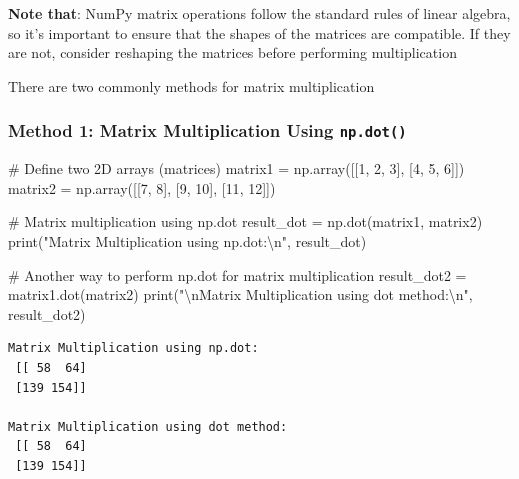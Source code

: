 \documentclass[
  letterpaper,
  DIV=11,
  numbers=noendperiod]{scrreprt}
\newenvironment{Shaded}{\begin{snugshade}}{\end{snugshade}}
\newcommand{\BuiltInTok}[1]{\textcolor[rgb]{0.00,0.23,0.31}{#1}}
\newcommand{\CharTok}[1]{\textcolor[rgb]{0.13,0.47,0.30}{#1}}
\newcommand{\CommentTok}[1]{\textcolor[rgb]{0.37,0.37,0.37}{#1}}
\newcommand{\DecValTok}[1]{\textcolor[rgb]{0.68,0.00,0.00}{#1}}
\newcommand{\NormalTok}[1]{\textcolor[rgb]{0.00,0.23,0.31}{#1}}
\newcommand{\OperatorTok}[1]{\textcolor[rgb]{0.37,0.37,0.37}{#1}}
\newcommand{\StringTok}[1]{\textcolor[rgb]{0.13,0.47,0.30}{#1}}
\begin{document}
\textbf{Note that}: NumPy matrix operations follow the standard rules of
linear algebra, so it's important to ensure that the shapes of the
matrices are compatible. If they are not, consider reshaping the
matrices before performing multiplication

There are two commonly methods for matrix multiplication

\hypertarget{method-1-matrix-multiplication-using-np.dot}{%
\subsubsection{\texorpdfstring{Method 1: Matrix Multiplication Using
\texttt{np.dot()}}{Method 1: Matrix Multiplication Using np.dot()}}\label{method-1-matrix-multiplication-using-np.dot}}

\begin{Shaded}
\begin{Highlighting}[]
\CommentTok{\# Define two 2D arrays (matrices)}
\NormalTok{matrix1 }\OperatorTok{=}\NormalTok{ np.array([[}\DecValTok{1}\NormalTok{, }\DecValTok{2}\NormalTok{, }\DecValTok{3}\NormalTok{], }
\NormalTok{                    [}\DecValTok{4}\NormalTok{, }\DecValTok{5}\NormalTok{, }\DecValTok{6}\NormalTok{]])}
\NormalTok{matrix2 }\OperatorTok{=}\NormalTok{ np.array([[}\DecValTok{7}\NormalTok{, }\DecValTok{8}\NormalTok{], }
\NormalTok{                    [}\DecValTok{9}\NormalTok{, }\DecValTok{10}\NormalTok{], }
\NormalTok{                    [}\DecValTok{11}\NormalTok{, }\DecValTok{12}\NormalTok{]])}

\CommentTok{\# Matrix multiplication using np.dot}
\NormalTok{result\_dot }\OperatorTok{=}\NormalTok{ np.dot(matrix1, matrix2)}
\BuiltInTok{print}\NormalTok{(}\StringTok{"Matrix Multiplication using np.dot:}\CharTok{\textbackslash{}n}\StringTok{"}\NormalTok{, result\_dot)}

\CommentTok{\# Another way to perform np.dot for matrix multiplication}
\NormalTok{result\_dot2 }\OperatorTok{=}\NormalTok{ matrix1.dot(matrix2)}
\BuiltInTok{print}\NormalTok{(}\StringTok{"}\CharTok{\textbackslash{}n}\StringTok{Matrix Multiplication using dot method:}\CharTok{\textbackslash{}n}\StringTok{"}\NormalTok{, result\_dot2)}
\end{Highlighting}
\end{Shaded}

\begin{verbatim}
Matrix Multiplication using np.dot:
 [[ 58  64]
 [139 154]]

Matrix Multiplication using dot method:
 [[ 58  64]
 [139 154]]
\end{verbatim}
\end{document}
